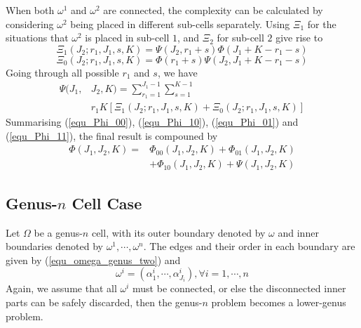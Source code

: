 \documentclass[conference]{IEEEtran}
\begin{document}
When both $\omega^1$ and $\omega^2$ are connected, the complexity can be calculated by considering $\omega^2$ being placed in 
different sub-cells separately. Using $\Xi_1$ for the situations that $\omega^2$ is placed in sub-cell $1$, 
and $\Xi_2$ for sub-cell $2$ give rise to
\begin{equation}
\Xi_{1}(J_2; r_1, J_1, s, K) = \Psi(J_2, r_1+s)\Phi(J_1+K-r_1-s)
\end{equation}
\begin{equation}
\Xi_{0}(J_2; r_1, J_1, s, K) = \Phi(r_1+s)\Psi(J_2, J_1+K-r_1-s)
\end{equation}
Going through all possible $r_1$ and $s$, we have 
\begin{equation}\label{equ_Phi_11}
\begin{aligned}
\Psi(J_1, &J_2, K) = \sum\limits_{r_1 = 1}^{J_1-1}\sum\limits_{s = 1}^{K-1}\\
&r_1K\left[\Xi_1\left(J_2; r_1, J_1, s, K\right) + \Xi_0\left(J_2; r_1, J_1, s, K\right)\right]
\end{aligned}
\end{equation} 
Summarising (\ref{equ_Phi_00}), (\ref{equ_Phi_10}), (\ref{equ_Phi_01}) and (\ref{equ_Phi_11}), the final result is compouned by
\begin{equation}
\begin{aligned}
\Phi(J_1, J_2, K) =& \Phi_{00}(J_1, J_2, K) + \Phi_{01}(J_1, J_2, K)\\
& + \Phi_{10}(J_1, J_2, K) + \Psi(J_1, J_2, K)
\end{aligned}
\end{equation}

\subsection{Genus-$n$ Cell Case}
Let $\Omega$ be a genus-$n$ cell, with its outer boundary denoted by $\omega$ and inner boundaries denoted by $\omega^1, \cdots, \omega^n$. The edges and their order in each boundary are given by (\ref{equ_omega_genus_two}) and 
\begin{equation}\label{equ_inner_boundaries}
\omega^i = (\alpha^i_1, \cdots, \alpha^i_{J_i}), \forall i = 1, \cdots, n
\end{equation}
Again, we assume that all $\omega^i$ must be connected, or else the disconnected inner parts can be safely discarded, then the genus-$n$ problem becomes a lower-genus problem. 
\end{document}
